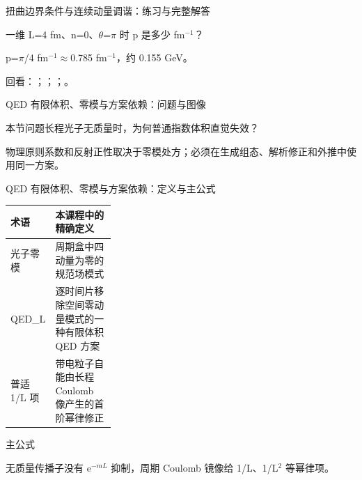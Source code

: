 \begin{frame}[t]{扭曲边界条件与连续动量调谐：练习与完整解答}
\footnotesize
\begin{block}{}一维 L=4 fm、n=0、\ensuremath{\theta}=\ensuremath{\pi} 时 p 是多少 fm\ensuremath{^{-1}}？\end{block}
\begin{exampleblock}{}p=\ensuremath{\pi}/\allowbreak{}4 fm\ensuremath{^{-1}}\ensuremath{\approx}0.785 fm\ensuremath{^{-1}}，约 0.155 GeV。\end{exampleblock}
\vfill
\scriptsize 回看：；；；。
\end{frame}

\begin{frame}[t]{QED 有限体积、零模与方案依赖：问题与图像}
\footnotesize
\begin{block}{本节问题}长程光子无质量时，为何普通指数体积直觉失效？\end{block}
\begin{block}{物理原则}\quad 系数和反射正性取决于零模处方；必须在生成组态、解析修正和外推中使用同一方案。\end{block}
\end{frame}

\begin{frame}[t]{QED 有限体积、零模与方案依赖：定义与主公式}
\footnotesize\begin{tabularx}{\linewidth}{p{0.30\linewidth}Y}
\toprule 术语 & 本课程中的精确定义\\\midrule
{} 光子零模 & 周期盒中四动量为零的规范场模式\\
 QED\_L & 逐时间片移除空间零动量模式的一种有限体积 QED 方案\\
 普适 1/\allowbreak{}L 项 & 带电粒子自能由长程 Coulomb 像产生的首阶幂律修正\\
\bottomrule\end{tabularx}\vspace{0.15cm}
\begin{block}{ 主公式}\centering{}\end{block}
无质量传播子没有 e\ensuremath{^{-mL}} 抑制，周期 Coulomb 镜像给 1/\allowbreak{}L、1/\allowbreak{}L\ensuremath{^{2}} 等幂律项。
\end{frame}

